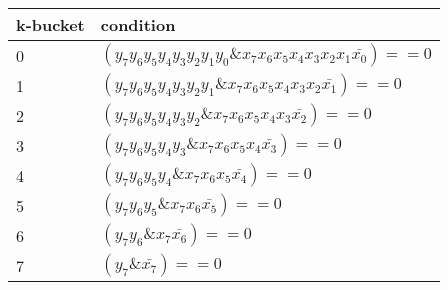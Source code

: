 \documentclass{basic}
\newcommand*\BitAnd{\mathbin{\&}}
\begin{document}
\begin{tabular}{|l|l|}
    \hline
    k-bucket & condition \\
    \hline
	0 & \((y_7 y_6 y_5 y_4 y_3 y_2 y_1 y_0 \BitAnd x_7 x_6 x_5 x_4 x_3 x_2 x_1 \bar{x_0}) == 0\) \\
	1 & \((y_7 y_6 y_5 y_4 y_3 y_2 y_1     \BitAnd x_7 x_6 x_5 x_4 x_3 x_2 \bar{x_1})     == 0\) \\  
	2 & \((y_7 y_6 y_5 y_4 y_3 y_2         \BitAnd x_7 x_6 x_5 x_4 x_3 \bar{x_2})         == 0\) \\
	3 & \((y_7 y_6 y_5 y_4 y_3             \BitAnd x_7 x_6 x_5 x_4 \bar{x_3})             == 0\) \\
	4 & \((y_7 y_6 y_5 y_4                 \BitAnd x_7 x_6 x_5 \bar{x_4})                 == 0\) \\
	5 & \((y_7 y_6 y_5                     \BitAnd x_7 x_6 \bar{x_5})                     == 0\) \\
	6 & \((y_7 y_6                         \BitAnd x_7 \bar{x_6})                         == 0\) \\
	7 & \((y_7                             \BitAnd \bar{x_7})                             == 0\) \\
	\hline
\end {tabular}
\end{document}
